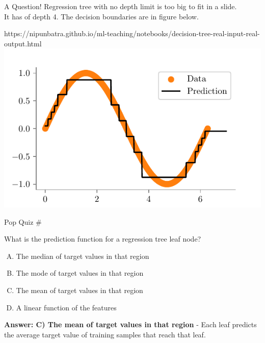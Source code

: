 \documentclass[usenames,dvipsnames]{beamer}
\begin{document}
\begin{frame}{A Question!}
Regression tree with no depth limit is too big to fit in a slide. \\
It has of depth 4. The decision boundaries are in figure below.\\
\begin{center}
	\begin{notebookbox}{https://nipunbatra.github.io/ml-teaching/notebooks/decision-tree-real-input-real-output.html}
		\includegraphics{../assets/decision-trees/figures/sine-depth-4.pdf}
	  \end{notebookbox}
\end{center}
\end{frame}

\begin{frame}{Pop Quiz \#\thepopquiz}
\begin{tcolorbox}[colback=blue!5!white,colframe=blue!75!black,title=Quick Question!]
What is the prediction function for a regression tree leaf node?
\begin{enumerate}[A)]
\item The median of target values in that region
\item The mode of target values in that region  
\item The mean of target values in that region
\item A linear function of the features
\end{enumerate}
\pause
\textbf{Answer: C) The mean of target values in that region} - Each leaf predicts the average target value of training samples that reach that leaf.
\end{tcolorbox}
\end{frame}
\end{document}

